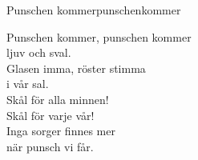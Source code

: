 \begin{song}{Punschen kommer}{punschenkommer}
    \av{}
    \begin{vers}
        Punschen kommer, punschen kommer\\
        ljuv och sval.\\
        Glasen imma, röster stimma\\
        i vår sal.\\
        Skål för alla minnen!\\
        Skål för varje vår!\\
        Inga sorger finnes mer\\
        när punsch vi får.\\
    \end{vers}
    \end{song}

